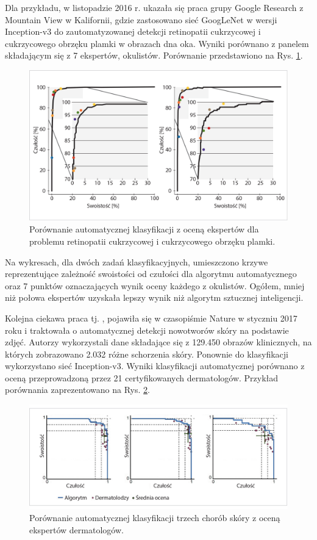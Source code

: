  Dla przykładu, w listopadzie 2016 r. ukazała się praca \cite{Gulshan2016} grupy Google Research z Mountain View w Kalifornii, gdzie zastosowano sieć GoogLeNet w wersji Inception-v3 do zautomatyzowanej detekcji retinopatii cukrzycowej i cukrzycowego obrzęku plamki w obrazach dna oka. Wyniki porównano z panelem składającym się z 7 ekspertów, okulistów. Porównanie przedstawiono na Rys. \ref{CAD_opto}.
 \begin{figure}[h!]
 	\centering
 	\includegraphics[width=1\textwidth]{figures/CAD-okulisci.jpg}
 	\caption{Porównanie automatycznej klasyfikacji z oceną ekspertów dla problemu retinopatii cukrzycowej i cukrzycowego obrzęku plamki.}
 	\label{CAD_opto}
 \end{figure}
 
 Na wykresach, dla dwóch zadań klasyfikacyjnych, umieszczono krzywe reprezentujące zależność swoistości od czułości dla algorytmu automatycznego oraz 7 punktów oznaczających wynik oceny każdego z okulistów. Ogółem, mniej niż połowa ekspertów uzyskała lepszy wynik niż algorytm sztucznej inteligencji.
 
 Kolejna ciekawa praca tj. \cite{Esteva2017}, pojawiła się w czasopiśmie Nature w styczniu 2017 roku i traktowała o automatycznej detekcji nowotworów skóry na podstawie zdjęć. Autorzy wykorzystali dane składające się z 129.450 obrazów klinicznych, na których zobrazowano 2.032 różne schorzenia skóry. Ponownie do klasyfikacji wykorzystano sieć Inception-v3. Wyniki klasyfikacji automatycznej porównano z oceną przeprowadzoną przez 21 certyfikowanych dermatologów. Przykład porównania zaprezentowano na Rys. \ref{CAD_derma}. 
 
 \begin{figure}[h!]
 	\centering
 	\includegraphics[width=1\textwidth]{figures/CAD-dermatolodzy.jpg}
 	\caption{Porównanie automatycznej klasyfikacji trzech chorób skóry z oceną ekspertów dermatologów.}
 	\label{CAD_derma}
 \end{figure}

